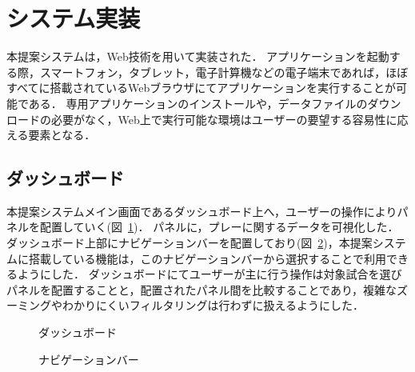 \documentclass[sotsuron]{kuee}
\begin{document}
	\section{システム実装}
			本提案システムは，Web技術を用いて実装された．
			アプリケーションを起動する際，スマートフォン，タブレット，電子計算機などの電子端末であれば，ほぼすべてに搭載されているWebブラウザにてアプリケーションを実行することが可能である．
			専用アプリケーションのインストールや，データファイルのダウンロードの必要がなく，Web上で実行可能な環境はユーザーの要望する容易性に応える要素となる．
		\subsection{ダッシュボード}
			本提案システムメイン画面であるダッシュボード上へ，ユーザーの操作によりパネルを配置していく(図~\ref{fig:dashboard})．
			パネルに，プレーに関するデータを可視化した．
			ダッシュボード上部にナビゲーションバーを配置しており(図~\ref{fig:nav})，本提案システムに搭載している機能は，このナビゲーションバーから選択することで利用できるようにした．
			ダッシュボードにてユーザーが主に行う操作は対象試合を選びパネルを配置することと，配置されたパネル間を比較することであり，複雑なズーミングやわかりにくいフィルタリングは行わずに扱えるようにした．
			\begin{figure}
				\begin{center}
				\end{center}
				\caption{ダッシュボード}
		  		\label{fig:dashboard}
			\end{figure}
			\begin{figure}
				\begin{center}
				\end{center}
				\caption{ナビゲーションバー}
		  		\label{fig:nav}
			\end{figure}
\end{document}
